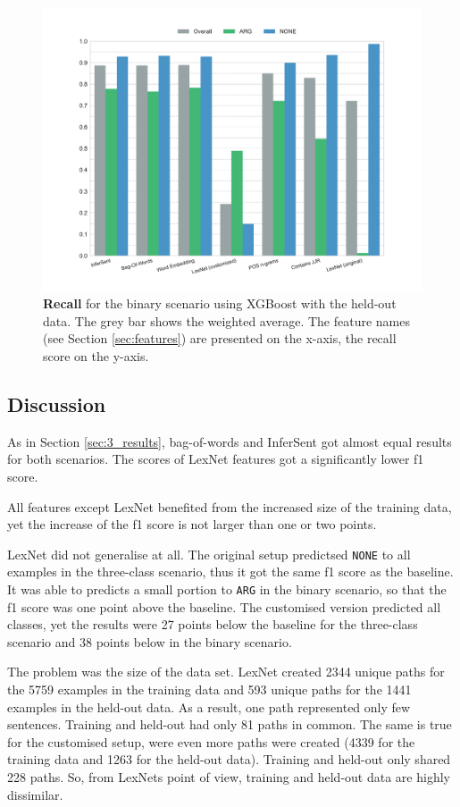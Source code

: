     \begin{figure}[htbp]
              \caption{\textbf{Recall} for the binary scenario using XGBoost with the held-out data. The grey bar shows the weighted average. The feature names (see Section \ref{sec:features}) are presented on the x-axis, the recall score on the y-axis.} 
       \label{fig:h_2_rec}
 \centering
	\includegraphics[width=0.9\linewidth]{images/heldout/h-recall-True}

\end{figure}
\FloatBarrier
\subsection{Discussion}
As in Section \ref{sec:3_results}, bag-of-words and InferSent got almost equal results for both scenarios. The scores of LexNet features got a significantly lower f1 score.


All features except LexNet benefited from the increased size of the training data, yet the increase of the f1 score is not larger than one or two points.\newline

LexNet did not generalise at all. The original setup predictsed \texttt{NONE} to all examples in the three-class scenario, thus it got the same f1 score as the baseline. It was able to predicts a small portion to \texttt{ARG} in the binary scenario, so that the f1 score was one point above the baseline. The customised version predicted all classes, yet the results were 27 points below the baseline for the three-class scenario and 38 points below in the binary scenario.

The problem was the size of the data set. LexNet created 2344 unique paths for the 5759 examples in the training data and 593 unique paths for the 1441 examples in the held-out data. As a result, one path represented only few sentences. Training and held-out had only 81 paths in common. The same is true for the customised setup, were even more paths were created (4339 for the training data and 1263 for the held-out data). Training and held-out only shared 228 paths. So, from LexNets point of view, training and held-out data are highly dissimilar.


